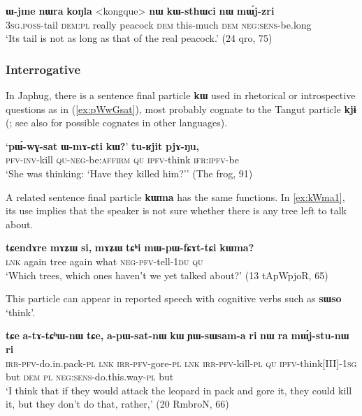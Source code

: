 \documentclass[oldfontcommands,oneside,a4paper,11pt]{article}
\newcommand{\ipa}[1]{{\phon\textbf{#1}}}
\begin{document}
  \begin{exe}
\ex \label{ex:kWsthWci}
\gll 
 \ipa{ɯ-jme}  	\ipa{nɯra}  	\ipa{koŋla}  	<kongque> 	\ipa{nɯ}  	\ipa{kɯ-sthɯci}  	\ipa{nɯ}  	\ipa{mɯ́j-zri}  \\
\textsc{ 3sg.poss}-tail \textsc{dem:pl} really peacock \textsc{dem} this-much \textsc{dem} \textsc{neg:sens}-be.long \\
\glt `Its tail is not as long as that of the real peacock.' (24 qro, 75)
  \end{exe}
 
\subsubsection{Interrogative}
In Japhug, there is a sentence final particle \ipa{kɯ} used in rhetorical or  introspective questions as in  (\ref{ex:pWwGsat}), most probably cognate to the Tangut particle \ipa{kjɨ} (\citealt{jacques11tangut.verb}; see also \citealt{sunhk95yiwen} for possible cognates in other languages).
 
  \begin{exe} 
 \ex \label{ex:pWwGsat}
\gll 
`\ipa{pɯ́-wɣ-sat} 	\ipa{ɯ-mɤ-ɕti} 	\ipa{\textbf{kɯ}?}' 	\ipa{tu-ʁjit} 	\ipa{pjɤ-ŋu,} \\
\textsc{pfv-inv}-kill \textsc{qu-neg}-be:\textsc{affirm} \textsc{qu} \textsc{ipfv}-think \textsc{ifr:ipfv}-be \\
\glt `She was thinking: `Have they killed him?'' (The frog, 91)
 \end{exe}  
 
 A related sentence final particle \ipa{kɯma} has the same functions. In  \ref{ex:kWma1}, its use implies that the speaker is not sure whether there is any tree left to talk about.
 
   \begin{exe} 
 \ex \label{ex:kWma1}
\gll 
 \ipa{tɕendɤre} 	\ipa{mɤʑɯ} 	\ipa{si,} 	\ipa{mɤʑɯ} 	\ipa{tɕʰi} 	\ipa{mɯ-pɯ-fɕɤt-tɕi} 	\ipa{\textbf{kɯma}?} \\
\textsc{lnk} again tree again what \textsc{neg-pfv}-tell-\textsc{1du} \textsc{qu} \\
\glt `Which trees, which ones haven't we yet talked about?'  (13 tApWpjoR, 65)
  \end{exe} 

This particle can appear in reported speech with cognitive verbs such as \ipa{sɯso} `think'.

    \begin{exe} 
 \ex \label{ex:kW.YWsWsama}
\gll \ipa{a-kɤ-nɯtsʰɤβ-nɯ} 	\ipa{tɕe} 	\ipa{a-tɤ-tɕʰɯ-nɯ} 	\ipa{tɕe,} 	\ipa{a-pɯ-sat-nɯ} 	\ipa{\textbf{kɯ}} 	\ipa{ɲɯ-sɯsam-a} 	\ipa{ri}  \ipa{nɯ} \ipa{ra} 	\ipa{mɯ́j-stu-nɯ} 	\ipa{ri} \\
\textsc{irr-pfv}-do.in.pack-\textsc{pl} \textsc{lnk} \textsc{irr-pfv}-gore-\textsc{pl} \textsc{lnk } \textsc{irr-pfv}-kill-\textsc{pl} \textsc{qu} \textsc{ipfv}-think[III]-\textsc{1sg} but \textsc{dem} \textsc{pl} \textsc{neg:sens}-do.this.way-\textsc{pl}  but \\
\glt `I think that if they would attack the leopard in pack and gore it, they could kill it, but they don't do that, rather,' (20 RmbroN, 66)
 \end{exe} 
 
\end{document}
